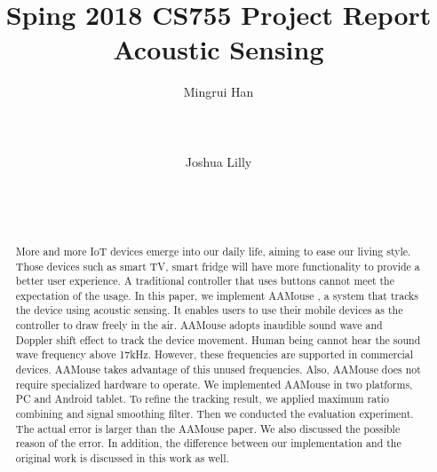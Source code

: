 \documentclass{acm_proc_article-sp}
\begin{document}
\title{Sping 2018 CS755 Project Report Acoustic Sensing}

\author{
\alignauthor
Mingrui Han\\
       \\
       \\
       \\
\alignauthor
Joshua Lilly\\
       \\
       \\
       \\
}

\maketitle
\begin{abstract}
More and more IoT devices emerge into our daily life, aiming to ease
our living style. Those devices such as smart TV, smart fridge
will have more functionality to provide a better user experience.
A traditional controller that uses buttons cannot meet the expectation
of the usage. In this paper, we implement AAMouse \cite{yun:turning}, a system that tracks the device using acoustic sensing. It enables
users to use their mobile devices as the controller to
draw freely in the air. AAMouse adopts inaudible sound wave and Doppler shift effect to track the device movement. Human being cannot
hear the sound wave frequency above 17kHz. However, these frequencies 
are supported in commercial devices. AAMouse takes advantage of this
unused frequencies. Also, AAMouse does not require specialized 
hardware to operate. We implemented AAMouse in two platforms, PC and Android tablet. To refine the tracking result, we applied maximum
ratio combining and signal smoothing filter. Then we conducted the 
evaluation experiment. The actual error is larger than the AAMouse
paper. We also discussed the possible reason of the error. In 
addition, the difference between our implementation and the 
original work is discussed in this work as well.
\end{abstract}

\end{document}
